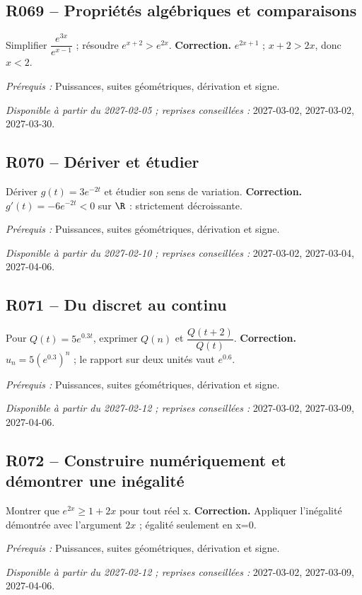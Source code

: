 \subsection*{R069 -- Propriétés algébriques et comparaisons}\label{R069}
Simplifier $\dfrac{e^{3x}}{e^{x-1}}$ ; résoudre $e^{x+2}>e^{2x}$.
\ifmxteacher\textbf{Correction.} $e^{2x+1}$ ; $x+2>2x$, donc $x<2$.\par\textit{Prérequis :} Puissances, suites géométriques, dérivation et signe.\par\textit{Disponible à partir du 2027-02-05 ; reprises conseillées :} 2027-03-02, 2027-03-02, 2027-03-30.\fi
{}\subsection*{R070 -- Dériver et étudier}\label{R070}
Dériver $g(t)=3e^{-2t}$ et étudier son sens de variation.
\ifmxteacher\textbf{Correction.} $g\prime(t)=-6e^{-2t}<0$ sur $\R$ : strictement décroissante.\par\textit{Prérequis :} Puissances, suites géométriques, dérivation et signe.\par\textit{Disponible à partir du 2027-02-10 ; reprises conseillées :} 2027-03-02, 2027-03-04, 2027-04-06.\fi
{}\subsection*{R071 -- Du discret au continu}\label{R071}
Pour $Q(t)=5e^{\num{0,3}t}$, exprimer $Q(n)$ et $\dfrac{Q(t+2)}{Q(t)}$.
\ifmxteacher\textbf{Correction.} $u_n=5(e^{\num{0,3}})^n$ ; le rapport sur deux unités vaut $e^{\num{0,6}}$.\par\textit{Prérequis :} Puissances, suites géométriques, dérivation et signe.\par\textit{Disponible à partir du 2027-02-12 ; reprises conseillées :} 2027-03-02, 2027-03-09, 2027-04-06.\fi
{}\subsection*{R072 -- Construire numériquement et démontrer une inégalité}\label{R072}
Montrer que $e^{2x}\geq1+2x$ pour tout réel x.
\ifmxteacher\textbf{Correction.} Appliquer l’inégalité démontrée avec l’argument $2x$ ; égalité seulement en x=0.\par\textit{Prérequis :} Puissances, suites géométriques, dérivation et signe.\par\textit{Disponible à partir du 2027-02-12 ; reprises conseillées :} 2027-03-02, 2027-03-09, 2027-04-06.\fi
